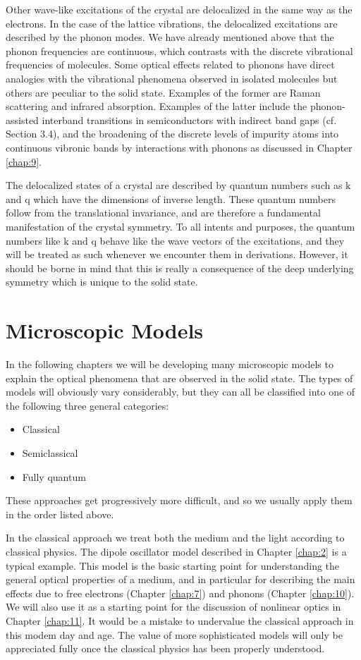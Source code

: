 \documentclass[12pt]{book}
\begin{document}
Other wave-like excitations of the crystal are delocalized in the same way as the electrons. In the case of the lattice vibrations, the delocalized excitations are described by the phonon modes. We have already mentioned above that the phonon frequencies are continuous, which contrasts with the discrete vibrational frequencies of molecules. Some optical effects related to phonons have direct analogies with the vibrational phenomena observed in isolated molecules but others are peculiar to the solid state. Examples of the former are Raman scattering and infrared absorption. Examples of the latter include the phonon-assisted interband transitions in semiconductors with indirect band gaps (cf. Section 3.4), and the broadening of the discrete levels of impurity atoms into continuous vibronic bands by interactions with phonons as discussed in Chapter \ref{chap:9}.

The delocalized states of a crystal are described by quantum numbers such as $\mathrm{k}$ and $\mathrm{q}$ which have the dimensions of inverse length. These quantum numbers follow from the translational invariance, and are therefore a fundamental manifestation of the crystal symmetry. To all intents and purposes, the quantum numbers like $\mathrm{k}$ and $\mathrm{q}$ behave like the wave vectors of the excitations, and they will be treated as such whenever we encounter them in derivations. However, it should be borne in mind that this is really a consequence of the deep underlying symmetry which is unique to the solid state.

\section{Microscopic Models}

In the following chapters we will be developing many microscopic models to explain the optical phenomena that are observed in the solid state. The types of models will obviously vary considerably, but they can all be classified into one of the following three general categories:
\begin{itemize}
  \item Classical
  \item Semiclassical
  \item Fully quantum
\end{itemize}
These approaches get progressively more difficult, and so we usually apply them in the order listed above.

In the classical approach we treat both the medium and the light according to classical physics. The dipole oscillator model described in Chapter \ref{chap:2} is a typical example. This model is the basic starting point for understanding the general optical properties of a medium, and in particular for describing the main effects due to free electrons (Chapter \ref{chap:7}) and phonons (Chapter \ref{chap:10}). We will also use it as a starting point for the discussion of nonlinear optics in Chapter \ref{chap:11}. It would be a mistake to undervalue the classical approach in this modem day and age. The value of more sophisticated models will only be appreciated fully once the classical physics has been properly understood.
\end{document}
